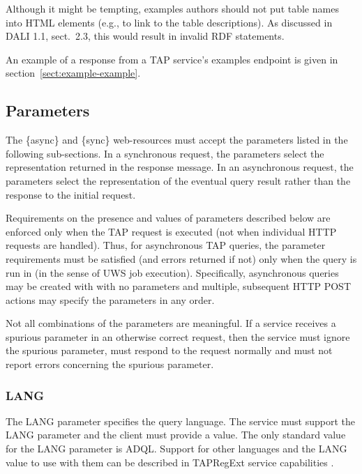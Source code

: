 \documentclass[11pt,letter]{ivoa}
\begin{document}
Although it might be tempting, examples authors should not put table
names into HTML  elements (e.g., to link to the table
descriptions).  As discussed in DALI 1.1, sect.~2.3, this would result
in invalid RDF statements.

An example of a response from a TAP service's examples endpoint is given
in section~\ref{sect:example-example}.

\subsection{Parameters}
\label{sec:parameters}

The \{async\} and \{sync\} web-resources must accept the parameters listed in 
the following sub-sections. In a synchronous request, the parameters select the 
representation returned in the response message. In an asynchronous request, the 
parameters select the representation of the eventual query result rather than 
the response to the initial request.

Requirements on the presence and values of parameters described below are 
enforced only when the TAP request is executed (not when individual HTTP 
requests are handled). Thus, for asynchronous TAP queries, the parameter 
requirements must be satisfied (and errors returned if not) only when the query 
is run in (in the sense of UWS job execution). Specifically, asynchronous 
queries may be created with with no parameters and multiple, subsequent HTTP 
POST actions may specify the parameters in any order.

Not all combinations of the parameters are meaningful. If a 
service receives a spurious parameter in an otherwise correct request, then the 
service must ignore the spurious parameter, must respond to the request normally 
and must not report errors concerning the spurious parameter.

\subsubsection{LANG}
\label{sec:LANG}

The LANG parameter specifies the query language. The service must support the LANG 
parameter and the client must provide a value. The only standard 
value for the LANG parameter is ADQL. Support for other 
languages and the LANG value to use with them can be described in
TAPRegExt service 
capabilities \citep{2012ivoa.spec.0827D}.
\end{document}
